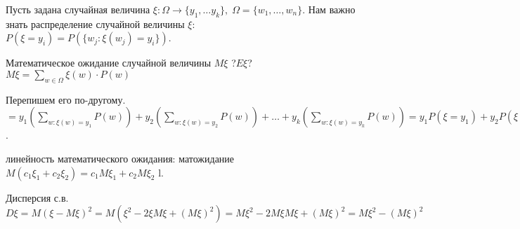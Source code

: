 Пусть задана случайная величина $\xi\colon \Omega \to \{y_1,\dots y_k\}, \; \Omega = \{w_1,\dots,w_n\}$.
Нам важно знать распределение случайной величины $\xi$: $P(\xi=y_i)=P(\{w_j\colon \xi(w_j)=y_i\})$.






Математическое ожидание случайной величины
$M\xi$ ?$E\xi$? $M\xi = \sum_{w \in \Omega} \xi(w)\cdot P(w)$ 

Перепишем его по-другому.
$=y_1\left(\sum_{w\colon \xi(w)=y_1} P(w)\right)+y_2\left(\sum_{w\colon \xi(w)=y_2} P(w)\right)+\dots+y_k\left(\sum_{w\colon \xi(w)=y_k} P(w)\right)=y_1P(\xi=y_1)+y_2P(\xi=y_2)+\dots y_kP(\xi=y_k)=\sum_{j=1}^{k} y_jP(\xi=y_j)$.

линейность математического ожидания: матожидание $M(c_1\xi_1+c_2\xi_2)=c_1M\xi_1+c_2M\xi_2$ l.


Дисперсия с.в. $D\xi= M(\xi-M\xi)^2=M(\xi^2-2\xi M\xi+(M\xi)^2)=M\xi^2-2M\xi M\xi+(M\xi)^2=M\xi^2-(M\xi)^2$ 
















